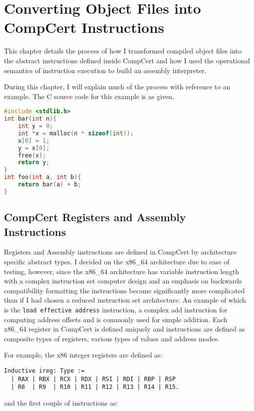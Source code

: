 \chapter{Converting Object Files into CompCert Instructions}\label{Disassembling}

This chapter details the process of how I transformed compiled object files into the abstract instructions defined inside CompCert and how I used the operational semantics of instruction execution to build an assembly interpreter.

During this chapter, I will explain much of the process with reference to an example. The C source code for this example is as given.

\begin{lstlisting}[language=C, caption=example\_object.c, label=code:example]
#include <stdlib.h>
int bar(int n){
    int y = 0;
    int *x = malloc(n * sizeof(int));
    x[0] = 1;
    y = x[0];
    free(x);
    return y;
}
int foo(int a, int b){
    return bar(a) + b;
}
\end{lstlisting}

\section{CompCert Registers and Assembly Instructions}\label{compilers}
Registers and Assembly instructions are defined in CompCert by architecture specific abstract types. I decided on the x86\_64 architecture due to ease of testing, however, since the x86\_64 architecture has variable instruction length with a complex instruction set computer design and an emphasis on backwards compatibility formatting the instructions became significantly more complicated than if I had chosen a reduced instruction set architecture. An example of which is the \lstinline{load effective address} instruction, a complex add instruction for computing address offsets and is commonly used for simple addition. Each x86\_64 register in CompCert is defined uniquely and instructions are defined as composite types of registers, various types of values and address modes.

For example, the x86 integer registers are defined as:

\begin{lstlisting}[language=Coq]
Inductive ireg: Type :=
  | RAX | RBX | RCX | RDX | RSI | RDI | RBP | RSP
  | R8  | R9  | R10 | R11 | R12 | R13 | R14 | R15.
\end{lstlisting}

and the first couple of instructions as:

